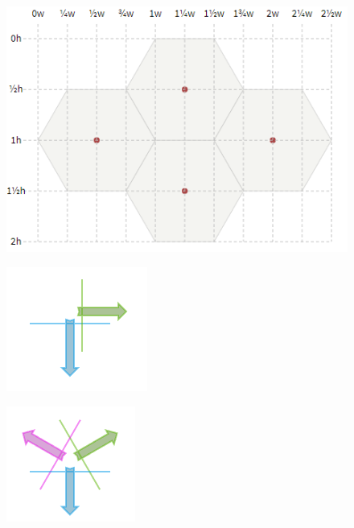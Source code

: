 \begin{figure}[h]
\centering
\includegraphics[scale=0.7]{kepek/image28.png}
\caption{}
\label{fig:image28}
\end{figure}

\begin{figure}[h]
\centering
\includegraphics[scale=0.7]{kepek/image4.png}
\caption{}
\label{fig:image4}
\end{figure}

\begin{figure}[h]
\centering
\includegraphics[scale=0.7]{kepek/image5.png}
\caption{}
\label{fig:image5}
\end{figure}

